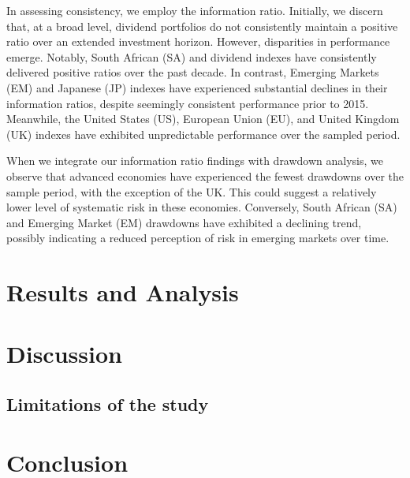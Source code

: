\documentclass[12pt,preprint, authoryear]{elsarticle}
\numberwithin{equation}{section}
\numberwithin{figure}{section}
\numberwithin{table}{section}
\begin{document}
In assessing consistency, we employ the information ratio. Initially, we
discern that, at a broad level, dividend portfolios do not consistently
maintain a positive ratio over an extended investment horizon. However,
disparities in performance emerge. Notably, South African (SA) and
dividend indexes have consistently delivered positive ratios over the
past decade. In contrast, Emerging Markets (EM) and Japanese (JP)
indexes have experienced substantial declines in their information
ratios, despite seemingly consistent performance prior to 2015.
Meanwhile, the United States (US), European Union (EU), and United
Kingdom (UK) indexes have exhibited unpredictable performance over the
sampled period.

When we integrate our information ratio findings with drawdown analysis,
we observe that advanced economies have experienced the fewest drawdowns
over the sample period, with the exception of the UK. This could suggest
a relatively lower level of systematic risk in these economies.
Conversely, South African (SA) and Emerging Market (EM) drawdowns have
exhibited a declining trend, possibly indicating a reduced perception of
risk in emerging markets over time.

\hypertarget{section}{%
\section{}\label{section}}

\hypertarget{results-and-analysis}{%
\section{Results and Analysis}\label{results-and-analysis}}

\hypertarget{discussion}{%
\section{Discussion}\label{discussion}}

\hypertarget{limitations-of-the-study}{%
\subsection{Limitations of the study}\label{limitations-of-the-study}}

\hypertarget{conclusion}{%
\section{Conclusion}\label{conclusion}}
\end{document}

